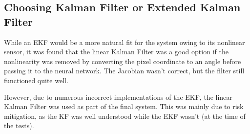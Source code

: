 \subsection{Choosing Kalman Filter or Extended Kalman Filter}\label{sec:kf_implementation}
While an EKF would be a more natural fit for the system owing to its nonlinear sensor, it was found that the linear Kalman Filter was a good option if the nonlinearity was removed by converting the pixel coordinate to an angle before passing it to the neural network. The Jacobian wasn't correct, but the filter still functioned quite well.

However, due to numerous incorrect implementations of the EKF, the linear Kalman Filter was used as part of the final system. This was mainly due to risk mitigation, as the KF was well understood while the EKF wasn't (at the time of the tests).
